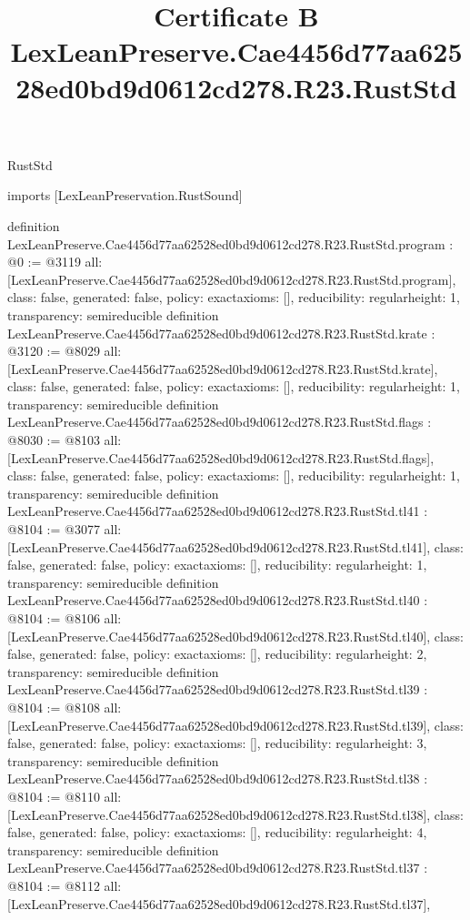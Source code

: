 \begin{lexlean}{RustStd}
\title{Certificate B LexLeanPreserve.Cae4456d77aa62528ed0bd9d0612cd278.R23.RustStd}
\begin{coremodule}
imports [LexLeanPreservation.RustSound]

definition LexLeanPreserve.Cae4456d77aa62528ed0bd9d0612cd278.R23.RustStd.program : @0 := @3119 {
  all: [LexLeanPreserve.Cae4456d77aa62528ed0bd9d0612cd278.R23.RustStd.program],
  class: false,
  generated: false,
  policy: exact{axioms: []},
  reducibility: regular{height: 1},
  transparency: semireducible
}
definition LexLeanPreserve.Cae4456d77aa62528ed0bd9d0612cd278.R23.RustStd.krate : @3120 := @8029 {
  all: [LexLeanPreserve.Cae4456d77aa62528ed0bd9d0612cd278.R23.RustStd.krate],
  class: false,
  generated: false,
  policy: exact{axioms: []},
  reducibility: regular{height: 1},
  transparency: semireducible
}
definition LexLeanPreserve.Cae4456d77aa62528ed0bd9d0612cd278.R23.RustStd.flags : @8030 := @8103 {
  all: [LexLeanPreserve.Cae4456d77aa62528ed0bd9d0612cd278.R23.RustStd.flags],
  class: false,
  generated: false,
  policy: exact{axioms: []},
  reducibility: regular{height: 1},
  transparency: semireducible
}
definition LexLeanPreserve.Cae4456d77aa62528ed0bd9d0612cd278.R23.RustStd.tl41 : @8104 := @3077 {
  all: [LexLeanPreserve.Cae4456d77aa62528ed0bd9d0612cd278.R23.RustStd.tl41],
  class: false,
  generated: false,
  policy: exact{axioms: []},
  reducibility: regular{height: 1},
  transparency: semireducible
}
definition LexLeanPreserve.Cae4456d77aa62528ed0bd9d0612cd278.R23.RustStd.tl40 : @8104 := @8106 {
  all: [LexLeanPreserve.Cae4456d77aa62528ed0bd9d0612cd278.R23.RustStd.tl40],
  class: false,
  generated: false,
  policy: exact{axioms: []},
  reducibility: regular{height: 2},
  transparency: semireducible
}
definition LexLeanPreserve.Cae4456d77aa62528ed0bd9d0612cd278.R23.RustStd.tl39 : @8104 := @8108 {
  all: [LexLeanPreserve.Cae4456d77aa62528ed0bd9d0612cd278.R23.RustStd.tl39],
  class: false,
  generated: false,
  policy: exact{axioms: []},
  reducibility: regular{height: 3},
  transparency: semireducible
}
definition LexLeanPreserve.Cae4456d77aa62528ed0bd9d0612cd278.R23.RustStd.tl38 : @8104 := @8110 {
  all: [LexLeanPreserve.Cae4456d77aa62528ed0bd9d0612cd278.R23.RustStd.tl38],
  class: false,
  generated: false,
  policy: exact{axioms: []},
  reducibility: regular{height: 4},
  transparency: semireducible
}
definition LexLeanPreserve.Cae4456d77aa62528ed0bd9d0612cd278.R23.RustStd.tl37 : @8104 := @8112 {
  all: [LexLeanPreserve.Cae4456d77aa62528ed0bd9d0612cd278.R23.RustStd.tl37],
}
\end{coremodule}
\end{lexlean}
